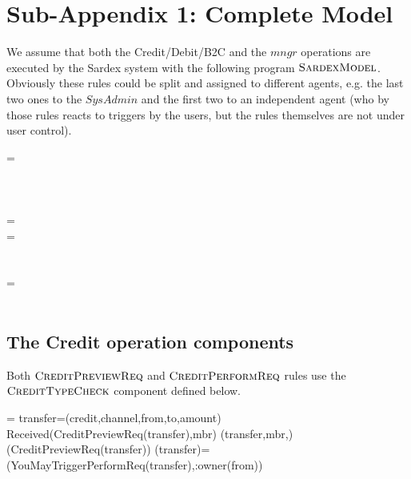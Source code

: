 \newpage
\section{Sub-Appendix 1: Complete Model}
\label{sect:appendixModel}

We assume that both the Credit/Debit/B2C and the $mngr$ operations are executed by the Sardex system with the following program $\hbox{\sc SardexModel}$. Obviously these rules could be split and assigned to different agents, e.g. the last two ones to the $SysAdmin$ and the first two to an independent agent (who by those rules reacts to triggers by the users, but the rules themselves are not under user control).

\begin{asm}
 =\+
  \\
  \\
  \\
  \\
   \-
\WHERE \+
  =\+
      \\
      \-
  =\+
      \\
      \\
     \\
     \-
   =\+    
     	\\
     	\\
 \end{asm}
 
 \subsection{The Credit operation components}
 
 Both $\hbox{\sc CreditPreviewReq}$ and $ \hbox{\sc CreditPerformReq}$ rules use the $ \hbox{\sc CreditTypeCheck}$ component defined below.
 
 \begin{asm}
  =\+
    \LET transfer=(credit,channel,from,to,amount)\+
        \IF Received(CreditPreviewReq(transfer),\FROM mbr) \THEN \+   
           (transfer,mbr,)\\
            (CreditPreviewReq(transfer)) \-
      \WHERE \+
         (transfer)=\+
        (YouMayTriggerPerformReq(transfer),\TO :owner(from))
 \end{asm}
 
